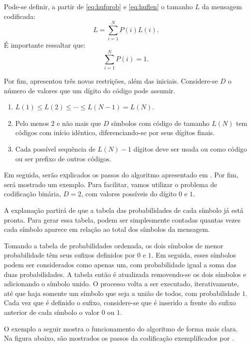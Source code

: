 \documentclass[cic,tc]{iiufrgs}
\begin{document}
Pode-se definir, a partir de \eqref{eq:hufprob} e \eqref{eq:huflen} o tamanho $L$ da mensagem 
codificada:
\begin{equation*}
    L = \sum_{i=1}^N {P(i)L(i)}.
\end{equation*}
É importante ressaltar que:
\begin{equation*}
    \sum_{i=1}^N {P(i)} = 1.
\end{equation*}

Por fim, \citet{HuffmanCoding} apresentou três novas restrições, além das iniciais.
Considere-se $D$ o número de valores que um dígito do código pode assumir.
\begin{enumerate}
    \item $L(1) \le L(2) \le \cdots \le L(N-1) = L(N)$.
    \item Pelo menos $2$ e não mais que $D$ símbolos com código de tamanho $L(N)$ tem códigos 
    com início idêntico, diferenciando-se por seus dígitos finais.
    \item Cada possível sequência de $L(N)-1$ dígitos deve ser usada ou como código ou ser 
    prefixo de outros códigos.
\end{enumerate}

Em seguida, serão explicados os passos do algoritmo apresentado em \citet{HuffmanCoding}.
Por fim, será mostrado um exemplo.
Para facilitar, vamos utilizar o problema de codificação binária, $D=2$, com valores 
possíveis do dígito $0$ e $1$.

A explanação partirá de que a tabela das probabilidades de cada símbolo já está pronta.
Para gerar essa tabela, podem ser simplesmente contadas quantas vezes cada símbolo aparece
em relação ao total dos símbolos da mensagem.

Tomando a tabela de probabilidades ordenada, os dois símbolos de menor probabilidade 
têm seus sufixos definidos por $0$ e $1$.
Em seguida, esses símbolos podem ser considerados como apenas um, com probabilidade igual 
a soma das duas probabilidades. 
A tabela então é atualizada removendo-se os dois símbolos e adicionando o símbolo unido. 
O processo volta a ser executado, iterativamente, até que haja somente um símbolo que seja 
a união de todos, com probabilidade $1$.
Cada vez que é definido o sufixo, considere-se que é inserido a frente do sufixo anterior 
de cada símbolo o valor $0$ ou $1$.

O exemplo a seguir mostra o funcionamento do algoritmo de forma mais clara.
Na figura abaixo, são mostrados os passos da codificação exemplificados por 
\citet{HuffmanCoding}.
\end{document}
